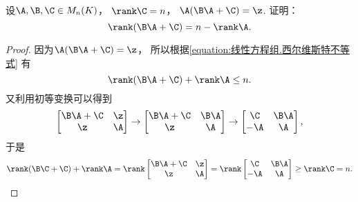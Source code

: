 \begin{example}
设\(\A,\B,\C \in M_n(K)\)，
\(\rank\C=n\)，
\(\A(\B\A+\C)=\z\).
证明：\[
	\rank(\B\A+\C)=n-\rank\A.
\]
\begin{proof}
因为\(\A(\B\A+\C)=\z\)，
所以根据\cref{equation:线性方程组.西尔维斯特不等式} 有\[
	\rank(\B\A+\C)+\rank\A \leq n.
\]
又利用初等变换可以得到\[
	\begin{bmatrix}
		\B\A+\C & \z \\
		\z & \A
	\end{bmatrix}
	\to \begin{bmatrix}
		\B\A+\C & \B\A \\
		\z & \A
	\end{bmatrix}
	\to \begin{bmatrix}
		\C & \B\A \\
		-\A & \A
	\end{bmatrix},
\]
于是\[
	\rank(\B\C+\C)
	+\rank\A
	= \rank\begin{bmatrix}
		\B\A+\C & \z \\
		\z & \A
	\end{bmatrix}
	= \rank\begin{bmatrix}
		\C & \B\A \\
		-\A & \A
	\end{bmatrix}
	\geq \rank\C = n.
	\qedhere
\]
\end{proof}
\end{example}

